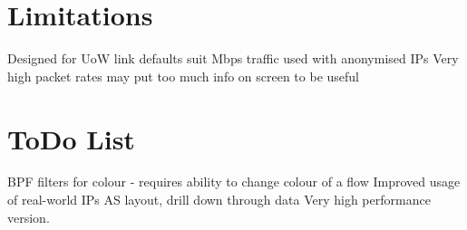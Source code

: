 \section{Limitations}
\label{limits}

Designed for UoW link
defaults suit Mbps traffic
used with anonymised IPs
Very high packet rates may put too much info on screen to be useful


\section{ToDo List}
\label{todo}

BPF filters for colour - requires ability to change colour of a flow
Improved usage of real-world IPs  AS layout, drill down through data
Very high performance version.
